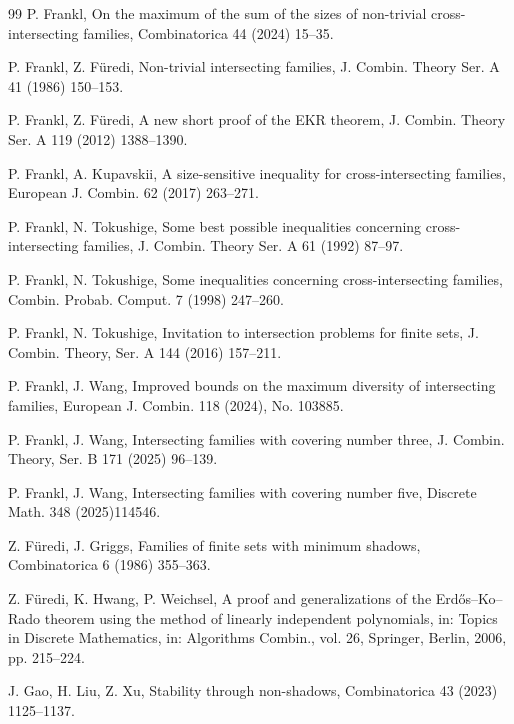 \documentclass[11pt]{article}
\numberwithin{equation}{section}
\begin{document}
\begin{thebibliography}{99}
P. Frankl, On the maximum of the sum of the sizes of non-trivial cross-intersecting families, Combinatorica 44 (2024) 15--35.

P. Frankl, Z. F\"{u}redi, 
Non-trivial intersecting families, 
J. Combin. Theory Ser. A 41 (1986) 150--153. 

P. Frankl, Z. F\"{u}redi, 
A new short proof of the EKR theorem, 
J. Combin. Theory Ser. A 119 (2012) 1388--1390. 

P. Frankl, A. Kupavskii, A size-sensitive inequality for cross-intersecting families,  European J. Combin. 62 (2017) 263--271.

P. Frankl, N. Tokushige, Some best possible inequalities concerning cross-intersecting families, J. Combin. Theory Ser. A 61 (1992) 87--97.

P. Frankl, N. Tokushige, 
Some inequalities concerning cross-intersecting families, Combin. Probab. Comput. 7 (1998) 247--260. 

P. Frankl, N. Tokushige, Invitation to intersection problems for finite sets, J. Combin. Theory, Ser. A 144 (2016) 157--211. 






  P. Frankl, J. Wang, 
 Improved bounds on the maximum diversity of intersecting families, 
European J. Combin. 118 (2024), No. 103885. 

  P. Frankl, J. Wang, 
 Intersecting families with covering number three, 
J. Combin. Theory, Ser. B 171 (2025) 96--139. 

  P. Frankl, J. Wang, 
 Intersecting families with covering number five, 
Discrete Math. 348 (2025)114546.

Z. F{\"u}redi, J. Griggs, Families of finite sets with minimum shadows, Combinatorica 6 (1986) 355--363. 

Z. F\"{u}redi, K. Hwang, P. Weichsel, 
A proof and generalizations of the Erd\H{o}s–Ko–Rado theorem 
using the method of linearly independent polynomials, 
in: Topics in Discrete Mathematics, 
in: Algorithms Combin., vol. 26, Springer, Berlin,
2006, pp. 215--224.  



J. Gao, H. Liu, Z. Xu, 
Stability through non-shadows, 
Combinatorica 43 (2023) 1125--1137. 


\end{thebibliography}
\end{document}
